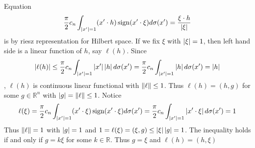 \begin{remark}
    Equation
    \begin{equation*}
        \frac{\pi}{2}c_n\int_{\left\lvert x'\right\rvert=1}(x'\cdot h)\operatorname{sign}(x'\cdot\xi)d\sigma(x')=\frac{\xi\cdot h}{\left\lvert\xi\right\rvert}
    \end{equation*}
    is by riesz representation for Hilbert space. If we fix $\xi$ with $\left\lvert\xi\right\rvert=1$, then left hand side is a linear function of $h$, say $\ell(h)$. Since
    \begin{equation*}
        \left\lvert\ell(h)\right\rvert\leq\frac{\pi}{2}c_n\int_{\left\lvert x'\right\rvert=1}\left\lvert x'\right\rvert\left\lvert h\right\rvert d\sigma(x')=\frac{\pi}{2}c_n\int_{\left\lvert x'\right\rvert=1}\left\lvert h\right\rvert d\sigma(x')=\left\lvert h\right\rvert
    \end{equation*}
    , $\ell(h)$ is continuous linear functional with $\lVert\ell\rVert\leq 1$. Thus $\ell(h)=(h,g)$ for some $g\in\mathbb{R}^n$ with $\left\lvert g\right\rvert=\lVert\ell\rVert\leq 1$. Notice
    \begin{equation*}
        \ell(\xi)=\frac{\pi}{2}c_n\int_{\left\lvert x'\right\rvert=1}(x'\cdot\xi)\operatorname{sign}(x'\cdot\xi)d\sigma(x')=\frac{\pi}{2}c_n\int_{\left\lvert x'\right\rvert=1}\left\lvert x'\cdot\xi\right\rvert d\sigma(x')=1
    \end{equation*}
    Thus $\lVert\ell\rVert=1$ with $\left\lvert g\right\rvert=1$ and $1=\ell(\xi)=(\xi,g)\leq\left\lvert\xi\right\rvert\left\lvert g\right\rvert=1$. The inequality holds if and only if $g=k\xi$ for some $k\in\mathbb{R}$. Thus $g=\xi$ and $\ell(h)=(h,\xi)$
\end{remark}
